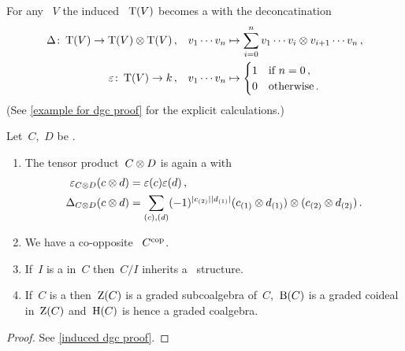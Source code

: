 \documentclass[a4paper,10pt,headings=standardclasses]{scrartcl}
\begin{document}
\begin{example}
  \label{example for dgc}
  For any {\dgv}~$V$ the induced {\dgv}~$\operatorname{T}(V)$ becomes a {\dgc} with the deconcatination
  \begin{align*}
    \Delta
    \colon
    \operatorname{T}(V)
    \to
    \operatorname{T}(V) \otimes \operatorname{T}(V) \,,
    \quad
    &v_1 \dotsm v_n
    \mapsto
    \sum_{i=0}^n
    v_1 \dotsm v_i \otimes v_{i+1} \dotsm v_n \,,
  \\
    \varepsilon
    \colon
    \operatorname{T}(V)
    \to
    k \,,
    \quad
    &v_1 \dotsm v_n
    \mapsto
    \begin{cases}
      1 & \text{if~$n = 0$} \,, \\
      0 & \text{otherwise} \,.
    \end{cases}
  \end{align*}
  (See \cref{example for dgc proof} for the explicit calculations.)
\end{example}


\begin{proposition}
  \label{induced dgc}
  Let~$C$,~$D$ be {\dgcs}.
  \begin{enumerate}
    \item
      The tensor product~$C \otimes D$ is again a {\dgc} with
      \begin{align*}
        \varepsilon_{C \otimes D}(c \otimes d)
        &=
        \varepsilon(c) \varepsilon(d) \,,
      \\
        \Delta_{C \otimes D}(c \otimes d)
        &=
        \sum_{(c), (d)}
        (-1)^{\lvert c_{(2)}\rvert \lvert d_{(1)}\rvert}
        (c_{(1)} \otimes d_{(1)}) \otimes (c_{(2)} \otimes d_{(2)}) \,.
      \end{align*}
    \item
      We have a co-opposite {\dgc}~$C^{\mathrm{cop}}$.
    \item
      If~$I$ is a {\dgci} in~$C$ then~$C/I$ inherits a~{\dgc} structure.
    \item
      If~$C$ is a {\dgc} then~$\operatorname{Z}(C)$ is a graded subcoalgebra of~$C$,~$\operatorname{B}(C)$ is a graded coideal in~$\operatorname{Z}(C)$ and~$\operatorname{H}(C)$ is hence a graded coalgebra.
  \end{enumerate}
\end{proposition}

\begin{proof}
  See \cref{induced dgc proof}.
\end{proof}
\end{document}

